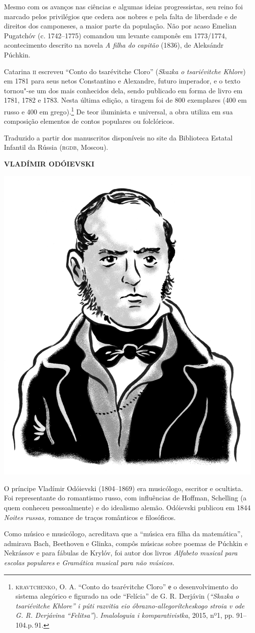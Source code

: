 Mesmo com os avanços nas ciências e algumas ideias progressistas, seu
reino foi marcado pelos privilégios que cedera aos nobres e pela falta
de liberdade e de direitos dos camponeses, a maior parte da população.
Não por acaso Emelian Pugatchóv (c. 1742--1775) comandou um levante
camponês em 1773/1774, acontecimento descrito na novela \emph{A filha do
capitão} (1836), de Aleksándr Púchkin.


Catarina \textsc{ii} escreveu ``Conto do tsarévitche Cloro'' (\emph{Skazka o tsariévitche Khlore}) em 1781 para seus
netos Constantino e Alexandre, futuro imperador, e o texto tornou"-se um
dos mais conhecidos dela, sendo publicado em forma de livro em 1781,
1782 e 1783. Nesta última edição, a tiragem foi de 800 exemplares (400
em russo e 400 em grego).\footnote{\scriptsize\textsc{kravtchenko}, O. A. “Conto do tsarévitche Cloro” е o desenvolvimento do sistema alegórico e figurado na ode “Felícia” de G. R. Derjávin (\textit{“Skazka o tsariévitche Khlore” i púti razvitia eio óbrazno-allegorítcheskogo stroia v ode G. R. Derjávina “Felitsa”}). \textit{Imalologuia i komparativistka}, 2015, nº1, pp. 91–104.p.\,91.} De teor iluminista e
universal, a obra utiliza em sua composição elementos de contos
populares ou folclóricos. 

Traduzido a partir dos manuscritos disponíveis no site da Biblioteca Estatal Infantil da Rússia
(\textsc{rgdb}, Moscou).

\bigskip
\noindent\textbf{VLADÍMIR ODÓIEVSKI}\medskip

\noindent\includegraphics[width=.8in]{./imgs/autor2.jpg}

\noindent{}O príncipe Vladímir Odóievski (1804--1869) era musicólogo, escritor e
ocultista. Foi representante do romantismo russo, com influências de
Hoffman, Schelling (a quem conheceu pessoalmente) e do idealismo alemão.
Odóievski publicou em 1844 \emph{Noites russas,} romance de traços
românticos e filosóficos.

Como músico e musicólogo, acreditava que a ``música era filha da
matemática'', admirava Bach, Beethoven e Glinka, compôs músicas sobre
poemas de Púchkin e Nekrássov e para fábulas de Krylóv, foi autor dos
livros \emph{Alfabeto musical para escolas populares} e \emph{Gramática
musical para não músicos.}

